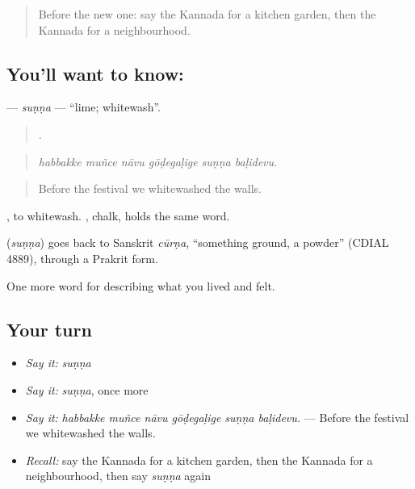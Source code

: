 \label{lesson:KA-C546-sunna}



\begin{quote}
Before the new one: say the Kannada for a kitchen garden, then the Kannada for a neighbourhood.
\end{quote}

\subsection*{You'll want to know: }
\textbf{} — \emph{suṇṇa} — \textquotedblleft{}lime; whitewash\textquotedblright{}.

\begin{quote}
     .
\end{quote}

\begin{quote}
\emph{habbakke muñce nāvu gōḍegaḷige suṇṇa baḷidevu.}
\end{quote}

\begin{quote}
Before the festival we whitewashed the walls.
\end{quote}

 , to whitewash. , chalk, holds the same word.

\begin{cousinweb}
\textbf{} (\emph{suṇṇa}) goes back to Sanskrit \emph{cūrṇa}, \textquotedblleft{}something ground, a powder\textquotedblright{} (CDIAL 4889), through a Prakrit form.
\end{cousinweb}

\begin{grammarlens}[title={What you've built}]
One more word for describing what you lived and felt.
\end{grammarlens}

\subsection*{Your turn}
\begin{itemize}
\raggedright
  \item \emph{Say it:} \emph{suṇṇa}
  \item \emph{Say it:} \emph{suṇṇa}, once more
  \item \emph{Say it:} \emph{habbakke muñce nāvu gōḍegaḷige suṇṇa baḷidevu.} — Before the festival we whitewashed the walls.
  \item \emph{Recall:} say the Kannada for a kitchen garden, then the Kannada for a neighbourhood, then say \emph{suṇṇa} again
\end{itemize}

